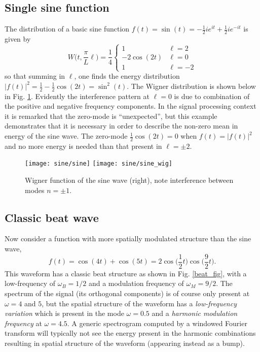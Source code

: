 \documentclass{article}
\begin{document}
\begin{appendices}
\subsection{Single sine function}
The distribution of a basic sine function $f(t) = \sin(t) = -\frac{1}{2}ie^{it} + \frac{1}{2}ie^{-it}$ is given by
\begin{equation}
  W\Big(t,\frac{\pi}{L}\ell\Big) = \frac{1}{4}\begin{cases} 1& \ell = 2\\
    -2\cos(2t) & \ell = 0\\
    1 & \ell = -2
  \end{cases}
\end{equation}
so that summing in $\ell$, one finds the energy distribution $|f(t)|^2 = \frac{1}{2}-\frac{1}{2}\cos(2t) = \sin^2(t)$. The Wigner distribution is shown below in Fig. \ref{sine_fig}. Evidently the interference pattern at $\ell=0$ is due to combination of the positive and negative frequency components. In the signal processing context it is remarked that the zero-mode is ``unexpected'', but this example demonstrates that it is necessary in order to describe the non-zero mean in energy of the sine wave. The zero-mode $\frac{1}{2}\cos(2t)=0$ when $f(t) = |f(t)|^2$ and no more energy is needed than that present in $\ell=\pm 2$.
\begin{figure}[ht!]
  \centering
  \texttt{[image: sine/sine]}
  \texttt{[image: sine/sine\_wig]}
  \caption{Wigner function of the sine wave (right), note interference between modes $n=\pm 1$.}\label{sine_fig}
\end{figure}

\subsection{Classic beat wave}
Now consider a function with more spatially modulated structure than the sine wave,
\begin{equation}
  f(t) = \cos(4t) + \cos(5t) = 2\cos\Big(\frac{1}{2}t\Big)\cos\Big(\frac{9}{2}t\Big).
\end{equation}
This waveform has a classic beat structure as shown in Fig. \ref{beat_fig}, with a low-frequency of $\omega_B = 1/2$  and a modulation frequency of $\omega_M = 9/2$. The spectrum of the signal (its orthogonal components) is of course only present at $\omega = 4$ and $5$, but the spatial structure of the waveform has a \textit{low-frequency variation} which is present in the mode $\omega = 0.5$ and a \textit{harmonic modulation frequency} at $\omega = 4.5$. A generic spectrogram computed by a windowed Fourier transform will typically not see the energy present in the harmonic combinations resulting in spatial structure of the waveform (appearing instead as a bump).


\end{appendices}
\end{document}
